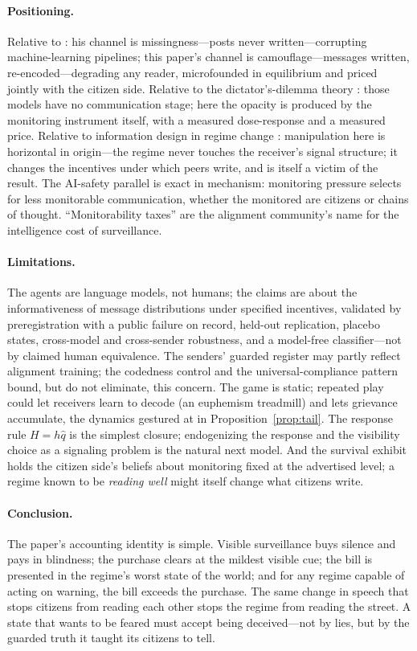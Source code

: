 \documentclass[11pt]{article}
\theoremstyle{remark}
\begin{document}
\paragraph{Positioning.} Relative to \citet{yang2025}: his channel is missingness---posts never written---corrupting machine-learning pipelines; this paper's channel is camouflage---messages written, re-encoded---degrading any reader, microfounded in equilibrium and priced jointly with the citizen side. Relative to the dictator's-dilemma theory \citep{egorov2009, gehlbach2026}: those models have no communication stage; here the opacity is produced by the monitoring instrument itself, with a measured dose-response and a measured price. Relative to information design in regime change \citep{edmond2013, inostroza2025}: manipulation here is horizontal in origin---the regime never touches the receiver's signal structure; it changes the incentives under which peers write, and is itself a victim of the result. The AI-safety parallel \citep{baker2025, motwani2024} is exact in mechanism: monitoring pressure selects for less monitorable communication, whether the monitored are citizens or chains of thought. ``Monitorability taxes'' are the alignment community's name for the intelligence cost of surveillance.

\paragraph{Limitations.} The agents are language models, not humans; the claims are about the informativeness of message distributions under specified incentives, validated by preregistration with a public failure on record, held-out replication, placebo states, cross-model and cross-sender robustness, and a model-free classifier---not by claimed human equivalence. The senders' guarded register may partly reflect alignment training; the codedness control and the universal-compliance pattern bound, but do not eliminate, this concern. The game is static; repeated play could let receivers learn to decode (an euphemism treadmill) and lets grievance accumulate, the dynamics gestured at in Proposition~\ref{prop:tail}. The response rule $H = h\hat q$ is the simplest closure; endogenizing the response and the visibility choice as a signaling problem is the natural next model. And the survival exhibit holds the citizen side's beliefs about monitoring fixed at the advertised level; a regime known to be \emph{reading well} might itself change what citizens write.

\paragraph{Conclusion.} The paper's accounting identity is simple. Visible surveillance buys silence and pays in blindness; the purchase clears at the mildest visible cue; the bill is presented in the regime's worst state of the world; and for any regime capable of acting on warning, the bill exceeds the purchase. The same change in speech that stops citizens from reading each other stops the regime from reading the street. A state that wants to be feared must accept being deceived---not by lies, but by the guarded truth it taught its citizens to tell.
\end{document}
